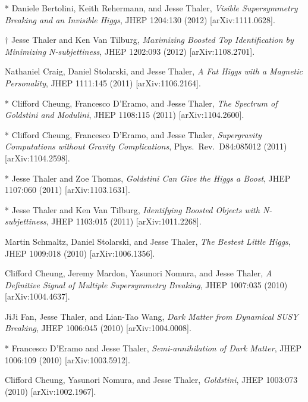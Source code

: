 \begin{list}{[]\addtocounter{jessecount}{-1}}{\leftmargin=3em \itemsep=4pt}
\item
* Daniele Bertolini, Keith Rehermann, and Jesse Thaler,
\emph{Visible Supersymmetry Breaking and an Invisible Higgs},
JHEP 1204:130 (2012)
[arXiv:1111.0628].

\item
$\dagger$ Jesse Thaler and Ken Van Tilburg,
\emph{Maximizing Boosted Top Identification by Minimizing N-subjettiness},
JHEP 1202:093 (2012)
[arXiv:1108.2701].

\item
 Nathaniel Craig, Daniel Stolarski, and Jesse Thaler,
\emph{A Fat Higgs with a Magnetic Personality},
JHEP 1111:145 (2011)
[arXiv:1106.2164].

\item
* Clifford Cheung, Francesco D'Eramo, and Jesse Thaler,
\emph{The Spectrum of Goldstini and Modulini},
JHEP 1108:115 (2011)
[arXiv:1104.2600].

\item
* Clifford Cheung, Francesco D'Eramo, and Jesse Thaler,
\emph{Supergravity Computations without Gravity Complications},
Phys.\ Rev.\ D84:085012 (2011)
[arXiv:1104.2598].

\item
* Jesse Thaler and Zoe Thomas,
\emph{Goldstini Can Give the Higgs a Boost},
JHEP 1107:060 (2011)
[arXiv:1103.1631].

\item
* Jesse Thaler and Ken Van Tilburg,
\emph{Identifying Boosted Objects with N-subjettiness},
JHEP 1103:015 (2011)
[arXiv:1011.2268].

\item
 Martin Schmaltz, Daniel Stolarski, and Jesse Thaler,
\emph{The Bestest Little Higgs},
JHEP 1009:018 (2010)
[arXiv:1006.1356].

\item
 Clifford Cheung, Jeremy Mardon, Yasunori Nomura, and Jesse Thaler,
\emph{A Definitive Signal of Multiple Supersymmetry Breaking},
JHEP 1007:035 (2010)
[arXiv:1004.4637].

\item
 JiJi Fan, Jesse Thaler, and Lian-Tao Wang,
\emph{Dark Matter from Dynamical SUSY Breaking},
JHEP 1006:045 (2010)
[arXiv:1004.0008].

\item
* Francesco D'Eramo and Jesse Thaler,
\emph{Semi-annihilation of Dark Matter},
JHEP 1006:109 (2010)
[arXiv:1003.5912].

\item
 Clifford Cheung, Yasunori Nomura, and Jesse Thaler,
\emph{Goldstini},
JHEP 1003:073 (2010)
[arXiv:1002.1967].


\end{list}
